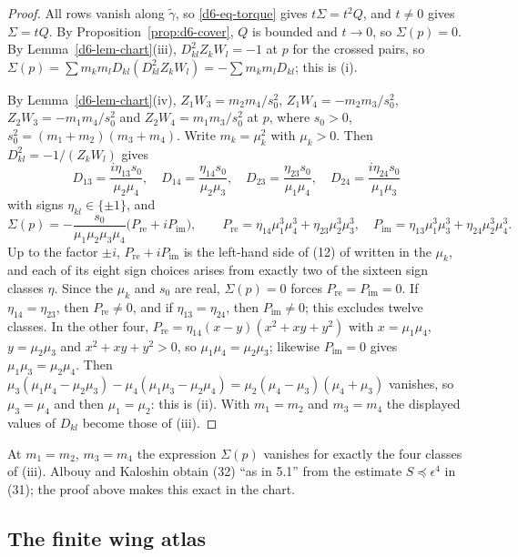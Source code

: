 \begin{proof}
All rows vanish along $\tilde\gamma$, so \eqref{d6-eq-torque} gives $t\Sigma=t^2Q$, and $t\ne0$
gives $\Sigma=tQ$.  By Proposition~\ref{prop:d6-cover}, $Q$ is bounded and $t\to0$, so
$\Sigma(p)=0$.  By Lemma~\ref{d6-lem-chart}(iii), $D_{kl}^2Z_kW_l=-1$ at $p$ for the crossed
pairs, so $\Sigma(p)=\sum m_km_lD_{kl}(D_{kl}^2Z_kW_l)=-\sum m_km_lD_{kl}$; this is (i).

By Lemma~\ref{d6-lem-chart}(iv), $Z_1W_3=m_2m_4/s_0^2$, $Z_1W_4=-m_2m_3/s_0^2$,
$Z_2W_3=-m_1m_4/s_0^2$ and $Z_2W_4=m_1m_3/s_0^2$ at $p$, where $s_0>0$,
$s_0^2=(m_1+m_2)(m_3+m_4)$.  Write $m_k=\mu_k^2$ with $\mu_k>0$.  Then $D_{kl}^2=-1/(Z_kW_l)$ gives
\[
  D_{13}=\frac{i\eta_{13}s_0}{\mu_2\mu_4},\quad D_{14}=\frac{\eta_{14}s_0}{\mu_2\mu_3},\quad
  D_{23}=\frac{\eta_{23}s_0}{\mu_1\mu_4},\quad D_{24}=\frac{i\eta_{24}s_0}{\mu_1\mu_3}
\]
with signs $\eta_{kl}\in\{\pm1\}$, and
\[
  \Sigma(p)=-\frac{s_0}{\mu_1\mu_2\mu_3\mu_4}\bigl(P_{\mathrm{re}}+iP_{\mathrm{im}}\bigr),\qquad
  P_{\mathrm{re}}=\eta_{14}\mu_1^3\mu_4^3+\eta_{23}\mu_2^3\mu_3^3,\quad
  P_{\mathrm{im}}=\eta_{13}\mu_1^3\mu_3^3+\eta_{24}\mu_2^3\mu_4^3.
\]
Up to the factor $\pm i$, $P_{\mathrm{re}}+iP_{\mathrm{im}}$ is the left-hand side of (12) of
\cite[\S5.1]{AK} written in the $\mu_k$, and each of its eight sign choices arises from exactly two
of the sixteen sign classes $\eta$.
Since the $\mu_k$ and $s_0$ are real, $\Sigma(p)=0$ forces $P_{\mathrm{re}}=P_{\mathrm{im}}=0$.  If
$\eta_{14}=\eta_{23}$, then $P_{\mathrm{re}}\ne0$, and if $\eta_{13}=\eta_{24}$, then
$P_{\mathrm{im}}\ne0$; this excludes twelve classes.  In the other four,
$P_{\mathrm{re}}=\eta_{14}(x-y)(x^2+xy+y^2)$ with $x=\mu_1\mu_4$, $y=\mu_2\mu_3$ and
$x^2+xy+y^2>0$, so $\mu_1\mu_4=\mu_2\mu_3$; likewise $P_{\mathrm{im}}=0$ gives
$\mu_1\mu_3=\mu_2\mu_4$.  Then
$\mu_3(\mu_1\mu_4-\mu_2\mu_3)-\mu_4(\mu_1\mu_3-\mu_2\mu_4)=\mu_2(\mu_4-\mu_3)(\mu_4+\mu_3)$
vanishes, so $\mu_3=\mu_4$ and then $\mu_1=\mu_2$: this is (ii).  With $m_1=m_2$ and $m_3=m_4$
the displayed values of $D_{kl}$ become those of (iii).
\end{proof}
At $m_1=m_2$, $m_3=m_4$ the expression $\Sigma(p)$ vanishes for exactly the four classes of (iii).
Albouy and Kaloshin \cite[\S8.6]{AK} obtain (32) ``as in 5.1'' from the estimate
$S\preccurlyeq\epsilon^4$ in (31); the proof above makes this exact in the chart.

\subsection{The finite wing atlas}

